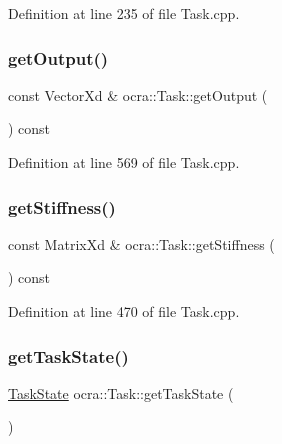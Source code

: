 Definition at line 235 of file Task.\+cpp.

\hypertarget{classocra_1_1Task_a61314a6ce8b06d8fbe3df06050b0ed4b}{}\label{classocra_1_1Task_a61314a6ce8b06d8fbe3df06050b0ed4b} 
\subsubsection{\texorpdfstring{get\+Output()}{getOutput()}}
{\footnotesize\ttfamily const Vector\+Xd \& ocra\+::\+Task\+::get\+Output (\begin{DoxyParamCaption}{ }\end{DoxyParamCaption}) const}



Definition at line 569 of file Task.\+cpp.

\hypertarget{classocra_1_1Task_a4aa13d0dbdd46774ca02dcd220a5bfc4}{}\label{classocra_1_1Task_a4aa13d0dbdd46774ca02dcd220a5bfc4} 
\subsubsection{\texorpdfstring{get\+Stiffness()}{getStiffness()}}
{\footnotesize\ttfamily const Matrix\+Xd \& ocra\+::\+Task\+::get\+Stiffness (\begin{DoxyParamCaption}{ }\end{DoxyParamCaption}) const}



Definition at line 470 of file Task.\+cpp.

\hypertarget{classocra_1_1Task_a81def8087dc41ef0a02406f208be4833}{}\label{classocra_1_1Task_a81def8087dc41ef0a02406f208be4833} 
\subsubsection{\texorpdfstring{get\+Task\+State()}{getTaskState()}}
{\footnotesize\ttfamily \hyperlink{classocra_1_1TaskState}{Task\+State} ocra\+::\+Task\+::get\+Task\+State (\begin{DoxyParamCaption}{ }\end{DoxyParamCaption})}



